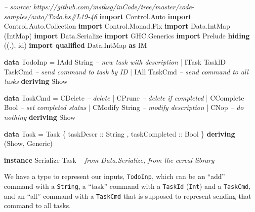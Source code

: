\documentclass[]{article}
\newenvironment{Shaded}{}{}
\newcommand{\KeywordTok}[1]{\textcolor[rgb]{0.00,0.44,0.13}{\textbf{#1}}}
\newcommand{\DataTypeTok}[1]{\textcolor[rgb]{0.56,0.13,0.00}{#1}}
\newcommand{\CommentTok}[1]{\textcolor[rgb]{0.38,0.63,0.69}{\textit{#1}}}
\newcommand{\OtherTok}[1]{\textcolor[rgb]{0.00,0.44,0.13}{#1}}
\newcommand{\FunctionTok}[1]{\textcolor[rgb]{0.02,0.16,0.49}{#1}}
\newcommand{\NormalTok}[1]{#1}
\begin{document}
\begin{Shaded}
\begin{Highlighting}[]
\CommentTok{-- source: https://github.com/mstksg/inCode/tree/master/code-samples/auto/Todo.hs#L19-46}
\KeywordTok{import }\DataTypeTok{Control.Auto}
\KeywordTok{import }\DataTypeTok{Control.Auto.Collection}
\KeywordTok{import }\DataTypeTok{Control.Monad.Fix}
\KeywordTok{import }\DataTypeTok{Data.IntMap}\NormalTok{             (}\DataTypeTok{IntMap}\NormalTok{)}
\KeywordTok{import }\DataTypeTok{Data.Serialize}
\KeywordTok{import }\DataTypeTok{GHC.Generics}
\KeywordTok{import }\DataTypeTok{Prelude} \KeywordTok{hiding}\NormalTok{          ((.), id)}
\KeywordTok{import qualified} \DataTypeTok{Data.IntMap}   \KeywordTok{as} \DataTypeTok{IM}

\KeywordTok{data} \DataTypeTok{TodoInp} \FunctionTok{=} \DataTypeTok{IAdd}  \DataTypeTok{String}           \CommentTok{-- new task with description}
             \FunctionTok{|} \DataTypeTok{ITask} \DataTypeTok{TaskID} \DataTypeTok{TaskCmd}   \CommentTok{-- send command to task by ID}
             \FunctionTok{|} \DataTypeTok{IAll} \DataTypeTok{TaskCmd}           \CommentTok{-- send command to all tasks}
             \KeywordTok{deriving} \DataTypeTok{Show}

\KeywordTok{data} \DataTypeTok{TaskCmd} \FunctionTok{=} \DataTypeTok{CDelete}          \CommentTok{-- delete}
             \FunctionTok{|} \DataTypeTok{CPrune}           \CommentTok{-- delete if completed}
             \FunctionTok{|} \DataTypeTok{CComplete} \DataTypeTok{Bool}   \CommentTok{-- set completed status}
             \FunctionTok{|} \DataTypeTok{CModify} \DataTypeTok{String}   \CommentTok{-- modify description}
             \FunctionTok{|} \DataTypeTok{CNop}             \CommentTok{-- do nothing}
             \KeywordTok{deriving} \DataTypeTok{Show}

\KeywordTok{data} \DataTypeTok{Task} \FunctionTok{=} \DataTypeTok{Task}\NormalTok{ \{}\OtherTok{ taskDescr     ::} \DataTypeTok{String}
\NormalTok{                 ,}\OtherTok{ taskCompleted ::} \DataTypeTok{Bool}
\NormalTok{                 \} }\KeywordTok{deriving}\NormalTok{ (}\DataTypeTok{Show}\NormalTok{, }\DataTypeTok{Generic}\NormalTok{)}

\KeywordTok{instance} \DataTypeTok{Serialize} \DataTypeTok{Task} \CommentTok{-- from Data.Serialize, from the cereal library}
\end{Highlighting}
\end{Shaded}

We have a type to represent our inputs, \texttt{TodoInp}, which can be an
``add'' command with a \texttt{String}, a ``task'' command with a
\texttt{TaskId} (\texttt{Int}) and a \texttt{TaskCmd}, and an ``all'' command
with a \texttt{TaskCmd} that is supposed to represent sending that command to
all tasks.
\end{document}
